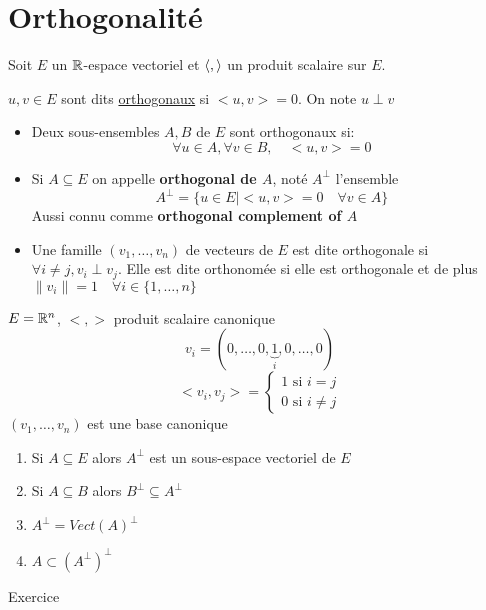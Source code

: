 \section{Orthogonalité}
Soit $E$ un  $\mathbb{R}$-espace vectoriel et  $\left\langle  ,  \right\rangle$ un produit scalaire sur  $E$.
\begin{definition}\label{def:orthogonal}
     $u, v \in E$ sont dits \underline{orthogonaux} si  $<u, v> = 0$. On note  $u \perp v$
      \begin{itemize}
         \item Deux sous-ensembles $A, B$ de  $E$ sont orthogonaux si:
              \[
             \forall u \in A, \forall v \in B, \quad <u, v> = 0
             \] 
         \item Si $A \subseteq E$ on appelle \textbf{orthogonal de $A$}, noté  $A^{\perp}$ l'ensemble
              \[
                  A^{\perp} = \{ u \in E \mid <u, v> = 0 \quad \forall v \in A \}
             \] 
             Aussi connu comme \textbf{orthogonal complement of $A$}
         \item Une famille $(v_1, \ldots, v_n)$ de vecteurs de $E$ est dite orthogonale si  $\forall i \neq j, v_i \perp v_j$. Elle est dite orthonomée si elle est orthogonale et de plus $\|v_i\| = 1 \quad \forall i \in \{ 1, \ldots, n \}$
     \end{itemize}
\end{definition}
\begin{eg}
   $E = \mathbb{R}^n$,  $< , >$ produit scalaire canonique 
   \[
       v_i = (0, \ldots, 0, \underbrace{1}_{i}, 0, \ldots, 0)
   \] 
   \[
   <v_i, v_j> = \begin{cases}
       1 \text{ si } i = j\\  
       0 \text{ si } i \neq  j
   \end{cases}
   \] 
   $(v_1, \ldots, v_n)$ est une base canonique
\end{eg}
\begin{prop}
    \begin{enumerate}
        \item 
            Si $A \subseteq E$ alors $A^{\perp}$ est un sous-espace vectoriel de  $E$ 
        \item Si $A \subseteq B$ alors $B^{\perp} \subseteq A^{\perp}$
        \item $A^{\perp} = Vect(A)^{\perp}$
        \item $A \subset (A^{\perp})^{\perp}$ 
    \end{enumerate}
\end{prop}
\begin{explanation}
   Exercice 
\end{explanation}
